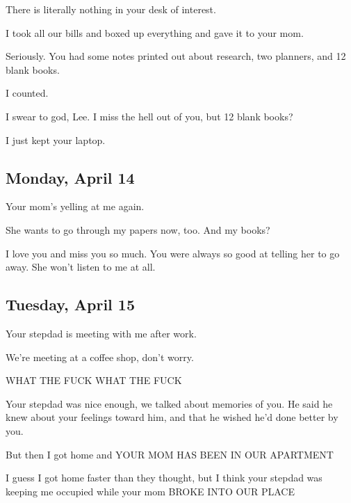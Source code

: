 {
There is literally nothing in your
desk of interest.

I took all our bills and boxed up
everything and gave it to your mom.

Seriously. You had some notes
printed out about research, two planners, and 12 blank books.

I counted.

I swear to god, Lee. I miss the hell
out of you, but 12 blank books?

I just kept your laptop.

\newpage

\subsection*{Monday, April 14}\label{monday-april-14}

Your mom's yelling at me again.

She wants to go through my papers
now, too. And my books?

I love you and miss you so much. You
were always so good at telling her to go away. She won't listen to me at
all.

\newpage

\subsection*{Tuesday, April 15}\label{tuesday-april-15}

Your stepdad is meeting with me
after work.

We're meeting at a coffee shop,
don't worry.

WHAT THE FUCK WHAT THE FUCK

Your stepdad was nice enough, we
talked about memories of you. He said he knew about your feelings toward
him, and that he wished he'd done better by you.

But then I got home and YOUR MOM HAS
BEEN IN OUR APARTMENT

I guess I got home faster than they
thought, but I think your stepdad was keeping me occupied while your mom
BROKE INTO OUR PLACE

}
